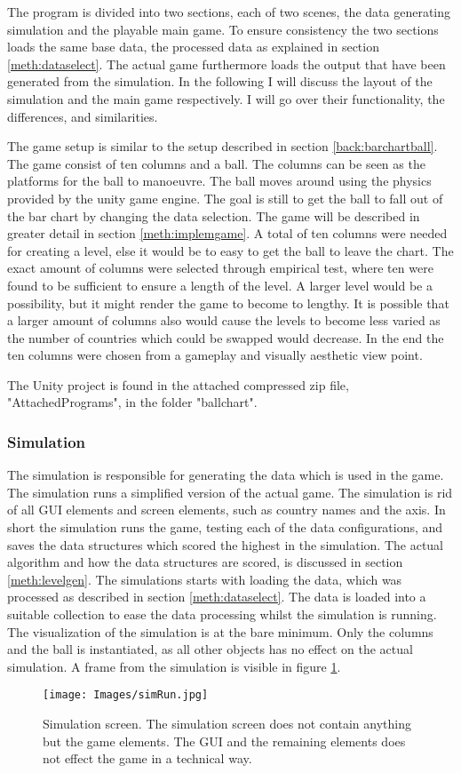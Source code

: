 \documentclass[a4paper,11pt]{article}
\begin{document}
The program is divided into two sections, each of two scenes, the data generating simulation and the playable main game. To ensure consistency the two sections loads the same base data, the processed data as explained in section \ref{meth:dataselect}. The actual game furthermore loads the output that have been generated from the simulation. In the following I will discuss the layout of the simulation and the main game respectively. I will go over their functionality, the differences, and similarities.

The game setup is similar to the setup described in section \ref{back:barchartball}. The game consist of ten columns and a ball. The columns can be seen as the platforms for the ball to manoeuvre. The ball moves around using the physics provided by the unity game engine. The goal is still to get the ball to fall out of the bar chart by changing the data selection. The game will be described in greater detail in section \ref{meth:implemgame}.
A total of ten columns were needed for creating a level, else it would be to easy to get the ball to leave the chart. The exact amount of columns were selected through empirical test, where ten were found to be sufficient to ensure a length of the level. A larger level would be a possibility, but it might render the game to become to lengthy. It is possible that a larger amount of columns also would cause the levels to become less varied as the number of countries which could be swapped would decrease. In the end the ten columns were chosen from a gameplay and visually aesthetic view point.

The Unity project is found in the attached compressed zip file, "AttachedPrograms", in the folder "ballchart".
\subsubsection{Simulation}
The simulation is responsible for generating the data which is used in the game. The simulation runs a simplified version of the actual game. The simulation is rid of all GUI elements and screen elements, such as country names and the axis. In short the simulation runs the game, testing each of the data configurations, and saves the data structures which scored the highest in the simulation. The actual algorithm and how the data structures are scored, is discussed in section \ref{meth:levelgen}.
The simulations starts with loading the data, which was processed as described in section \ref{meth:dataselect}. The data is loaded into a suitable collection to ease the data processing whilst the simulation is running. The visualization of the simulation is at the bare minimum. Only the columns and the ball is instantiated, as all other objects has no effect on the actual simulation. A frame from the simulation is visible in figure \ref{fig:sim}.
\begin{figure}[h]
    \centering
    \texttt{[image: Images/simRun.jpg]}
    \caption{Simulation screen. The simulation screen does not contain anything but the game elements. The GUI and the remaining elements does not effect the game in a technical way.}
    \label{fig:sim}
\end{figure}
\end{document}

